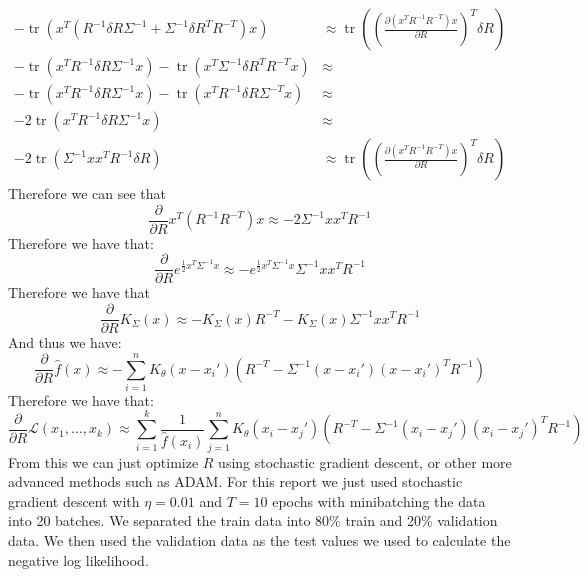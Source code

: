 \documentclass[10pt]{article}
\DeclareMathOperator{\Tr}{tr}
\begin{document}
\begin{align*}
    -\Tr\left(x^T \left(R^{-1}\delta R \Sigma^{-1} + \Sigma^{-1}\delta R^T R^{-T}\right)x\right) &\approx \Tr\left(\left(\frac{\partial(x^TR^{-1}R^{-T})x}{\partial R}\right)^T  \delta R\right)\\
    -\Tr\left(x^T R^{-1}\delta R \Sigma^{-1}x\right) -\Tr\left( x^T\Sigma^{-1}\delta R^T R^{-T}x\right)&\approx\\
    -\Tr\left(x^T R^{-1}\delta R \Sigma^{-1}x\right)-\Tr\left( x^TR^{-1}\delta R \Sigma^{-T} x\right)&\approx\\
    -2\Tr\left(x^T R^{-1}\delta R \Sigma^{-1}x\right) &\approx\\
    -2\Tr\left( \Sigma^{-1}xx^T R^{-1}\delta R\right) &\approx \Tr\left(\left(\frac{\partial(x^TR^{-1}R^{-T})x}{\partial R}\right)^T  \delta R\right)
\end{align*}
Therefore we can see that 
\begin{equation}
    \frac{\partial}{\partial R} x^T(R^{-1}R^{-T})x \approx -2\Sigma^{-1}xx^T R^{-1}
\end{equation}
Therefore we have that:
\begin{equation}
    \frac{\partial}{\partial R} e^{\frac{1}{2}x^T\Sigma^{-1}x} \approx -e^{\frac{1}{2}x^T\Sigma^{-1}x} \Sigma^{-1}xx^T R^{-1}
\end{equation}
Therefore we have that
\begin{equation}
    \frac{\partial}{\partial R} K_{\Sigma}(x) \approx -K_{\Sigma}(x)R^{-T} - K_{\Sigma}(x)\Sigma^{-1}xx^T R^{-1}
\end{equation}
And thus we have:
\begin{equation}
    \frac{\partial}{\partial R} \hat{f}(x) \approx -\sum_{i=1}^n K_{\theta}(x-x_i')\left(R^{-T} - \Sigma^{-1}(x-x_i')(x-x_i')^T R^{-1}\right)
\end{equation}
Therefore we have that:
\begin{equation}
    \frac{\partial}{\partial R}\mathcal{L}(x_1,\dots,x_k) \approx \sum_{i=1}^k \frac{1}{\hat{f}(x_i)} \sum_{j=1}^n K_{\theta}(x_i-x_j')\left(R^{-T} - \Sigma^{-1}(x_i-x_j')(x_i-x_j')^T R^{-1}\right)
\end{equation}
From this we can just optimize $R$ using stochastic gradient descent, or other more advanced methods such as ADAM. For this 
report we just used stochastic gradient descent with $\eta=0.01$ and $T=10$ epochs with minibatching the data into 20 batches. We 
separated the train data into 80\% train and 20\% validation data. We then used the validation data as the test values we
used to calculate the negative log likelihood.
\end{document}
